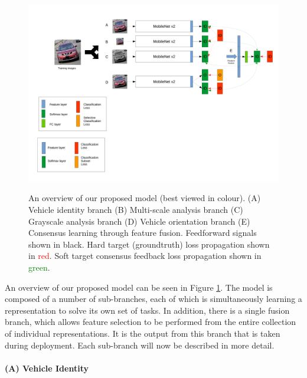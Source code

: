 \documentclass[10pt,twocolumn,letterpaper]{article}
\begin{document}
\begin{figure}
  \includegraphics[width=\linewidth,trim=0cm 8cm 0cm 0cm,clip=true]{images/system_overview_orient_only.pdf}
  \label{F:overview}
  \caption{An overview of our proposed model (best viewed in colour). (A) Vehicle identity branch (B) Multi-scale analysis branch (C) Grayscale analysis branch (D) Vehicle orientation branch
(E) Consensus learning through feature fusion. Feedforward signals shown in black. Hard target (groundtruth) loss propagation shown in \textcolor{red}{red}. Soft target consensus feedback loss propagation shown in \textcolor{green}{green}.}
\end{figure}

An overview of our proposed model can be seen in Figure \ref{F:overview}. The model is composed of a number of sub-branches, each of which is simultaneously learning a representation to solve its own set of tasks. In addition, there is a single fusion branch, which allows feature selection to be performed from the entire collection of individual representations. It is the output from this branch that is taken during deployment. Each sub-branch will now be described in more detail.

\paragraph{(A) Vehicle Identity}
\end{document}
